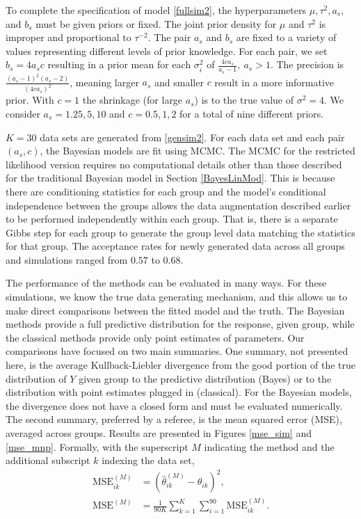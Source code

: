 \documentclass[ba]{imsart}
\begin{document}
To complete the specification of model \eqref{fullsim2}, the hyperparameters $\mu, \tau^{2}, a_{s}$, and $b_{s}$ must be given priors or fixed. The joint prior density for $\mu$ and $\tau^{2}$ is improper and proportional to $\tau^{-2}$. The pair $a_{s}$ and $b_{s}$ are fixed to a variety of values representing different levels of prior knowledge. For each pair, we set $b_{s} = 4a_{s}c$ resulting in a prior mean for each $\sigma^{2}_{i}$ of $\frac{4ca_{s}}{a_{s}-1}, \ a_{s} >1$. The precision is $\frac{(a_{s} -1)^{2}(a_{s}-2)}{(4ca_{s})^{2}}$, meaning larger $a_{s}$ and smaller $c$ result in a more informative prior. With $c = 1$ the shrinkage (for large $a_{s}$) is to the true value of $\sigma^{2} = 4$. We consider $a_{s} = 1.25,  5, 10$ and $c = 0.5, 1, 2$ for a total of nine different priors. 


$K = 30$ data sets are generated from \eqref{gensim2}. For each data set and each pair $(a_{s}, c)$, the Bayesian models are fit using MCMC. The MCMC for the restricted likelihood version requires no computational details other than those described for the traditional Bayesian model in Section \ref{BayesLinMod}. This is because there are conditioning statistics for each group and the model's conditional independence between the groups allows the data augmentation described earlier to be performed independently within each group. That is, there is a separate Gibbs step for each group to generate the group level data matching the statistics for that group. The acceptance rates for newly generated data across all groups and simulations ranged from $0.57$ to $0.68$.

The performance of the methods can be evaluated in many ways.  For these simulations, we know the true data generating mechanism, and this allows us to make direct comparisons between the fitted model and the truth.  The Bayesian methods provide a full predictive distribution for the response, given group, while the classical methods provide only point estimates of parameters.  Our comparisons have focused on two main summaries.  One summary, not presented here, is the average Kullback-Liebler divergence from the good portion of the true distribution of $Y$ given group to the predictive distribution (Bayes) or to the distribution with point estimates plugged in (classical).  For the Bayesian models, the divergence does not have a closed form and must be evaluated numerically.  The second summary, preferred by a referee, is the mean squared error (MSE), averaged across groups.  Results are presented in Figures \ref{mse_sim} and \ref{mse_mnp}.  Formally, with the superscript $M$ indicating the method and the additional subscript $k$ indexing the data set,
\begin{align}
\label{MSE}
\mbox{MSE}^{(M)}_{ik} & = (\hat\theta^{(M)}_{ik} - \theta_{ik})^2,  \\ 
\mbox{MSE}^{(M)} & = \frac{1}{90K} \sum_{k = 1}^{K} \sum_{i=1}^{90} \mbox{MSE}^{(M)}_{ik}.  
\end{align}
\end{document}
